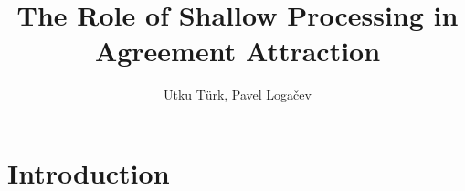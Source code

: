 \documentclass[doc,a4paper,man,natbib,floatsintext,noextraspace]{apa6}
\title{The Role of Shallow Processing in Agreement Attraction}
\author{Utku Türk, Pavel Loga\v{c}ev}
\affiliation{Boğaziçi University}
\begin{document}


\maketitle


\section{Introduction} \label{sec:Intro}

% 
% 
% 
% 
% 
% 


\end{document}
